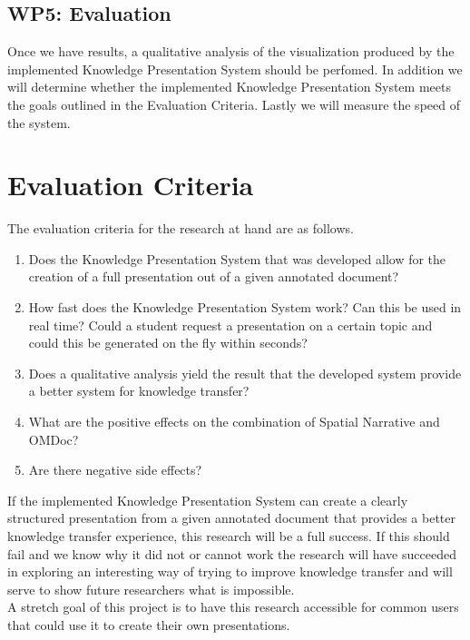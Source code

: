 \documentclass[twoside]{article}
\newcommand{\sys}{Knowledge Presentation System\xspace}
\begin{document}
\subsection{WP5: Evaluation}
Once we have results, a qualitative analysis of the visualization produced by the implemented \sys should be perfomed. In addition we will determine whether the implemented \sys meets the goals outlined in the Evaluation Criteria. Lastly we will measure the speed of the system.

\section{Evaluation Criteria}


The evaluation criteria for the research at hand are as follows. 
\begin{enumerate}
\item Does the \sys that was developed allow for the creation of a full presentation out of a given annotated document?
\item  How fast does the \sys work? Can this be used in real time? Could a student request a presentation on a certain topic and could this be generated on the fly within seconds?
\item Does a qualitative analysis yield the result that the developed system provide a better system for knowledge transfer?
\item What are the positive effects on the combination of Spatial Narrative and OMDoc?
\item Are there negative side effects?
\end{enumerate}

If the implemented \sys can create a clearly structured presentation from a given annotated document that provides a better knowledge transfer experience, this research will be a full success. If this should fail and we know why it did not or cannot work the research will have succeeded in exploring an interesting way of trying to improve knowledge transfer and will serve to show future researchers what is impossible. \\

A stretch goal of this project is to have this research accessible for common users that could use it to create their own presentations.
\end{document}
